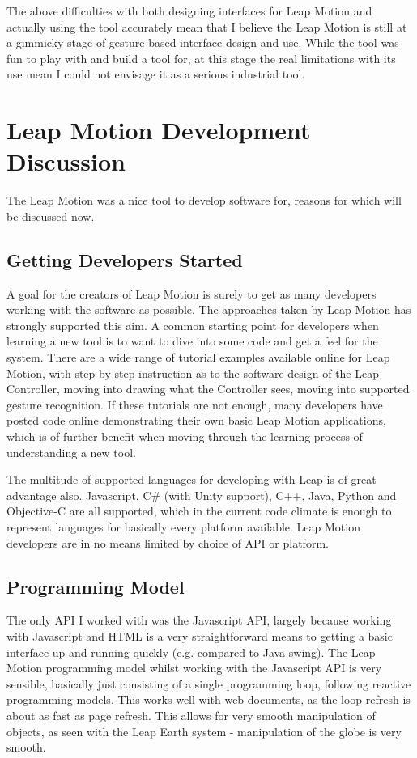 \documentclass{sigplanconf}
\begin{document}
The above difficulties with both designing interfaces for Leap Motion and actually using the tool accurately mean that I believe the Leap Motion is still at a gimmicky stage of gesture-based interface design and use. While the tool was fun to play with and build a tool for, at this stage the real limitations with its use mean I could not envisage it as a serious industrial tool. 

\section{Leap Motion Development Discussion}

The Leap Motion was a nice tool to develop software for, reasons for which will be discussed now.

\subsection{Getting Developers Started}

A goal for the creators of Leap Motion is surely to get as many developers working with the software as possible. The approaches taken by Leap Motion has strongly supported this aim. A common starting point for developers when learning a new tool is to want to dive into some code and get a feel for the system. There are a wide range of tutorial examples available online for Leap Motion, with step-by-step instruction as to the software design of the Leap Controller, moving into drawing what the Controller sees, moving into supported gesture recognition. If these tutorials are not enough, many developers have posted code online demonstrating their own basic Leap Motion applications, which is of further benefit when moving through the learning process of understanding a new tool. 

The multitude of supported languages for developing with Leap is of great advantage also. Javascript, C\# (with Unity support), C++, Java, Python and Objective-C are all supported, which in the current code climate is enough to represent languages for basically every platform available. Leap Motion developers are in no means limited by choice of API or platform.

\subsection{Programming Model}

The only API I worked with was the Javascript API, largely because working with Javascript and HTML is a very straightforward means to getting a basic interface up and running quickly (e.g. compared to Java swing). The Leap Motion programming model whilst working with the Javascript API is very sensible, basically just consisting of a single programming loop, following reactive programming models. This works well with web documents, as the loop refresh is about as fast as page refresh. This allows for very smooth manipulation of objects, as seen with the Leap Earth system - manipulation of the globe is very smooth. 
\end{document}
